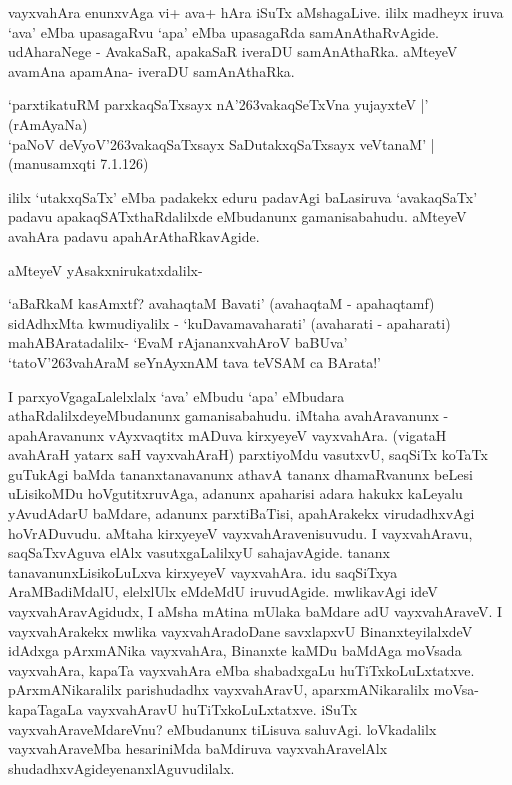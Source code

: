 vayxvahAra enunxvAga vi+ ava+ hAra iSuTx aMshagaLive. ililx madheyx iruva `ava' eMba upasagaRvu `apa' eMba upasagaRda samAnAthaRvAgide. udAharaNege - AvakaSaR, apakaSaR iveraDU samAnAthaRka. aMteyeV avamAna apamAna- iveraDU samAnAthaRka.

\begin{shloka}
`parxtikatuRM parxkaqSaTxsayx nA\char'263vakaqSeTxVna yujayxteV |' (rAmAyaNa)\\\label{223}
`paNoV deVyoV\char'263vakaqSaTxsayx SaDutakxqSaTxsayx veVtanaM' | (manusamxqti 7.1.126)\label{223}
\end{shloka}

ililx `utakxqSaTx' eMba padakekx eduru padavAgi baLasiruva `avakaqSaTx' padavu apakaqSATxthaRdalilxde eMbudanunx gamanisabahudu. aMteyeV avahAra padavu apahArAthaRkavAgide.

aMteyeV yAsakxnirukatxdalilx-

\begin{shloka}
`aBaRkaM kasAmxtf? avahaqtaM Bavati' (avahaqtaM - apahaqtamf)\\\label{224}
sidAdhxMta kwmudiyalilx - `kuDavamavaharati' (avaharati - apaharati)\\
mahABAratadalilx- `EvaM rAjananxvahAroV baBUva'\\\label{224}
`tatoV\char'263vahAraM seYnAyxnAM tava teVSAM ca BArata!'
\end{shloka}

I parxyoVgagaLalelxlalx `ava' eMbudu `apa' eMbudara athaRdalilxdeyeMbudanunx gamanisabahudu. iMtaha avahAravanunx - apahAravanunx vAyxvaqtitx mADuva kirxyeyeV vayxvahAra. (vigataH avahAraH yatarx saH vayxvahAraH) parxtiyoMdu vasutxvU, saqSiTx koTaTx guTukAgi baMda tananxtanavanunx athavA tananx dhamaRvanunx beLesi uLisikoMDu hoVgutitxruvAga, adanunx apaharisi adara hakukx kaLeyalu yAvudAdarU baMdare, adanunx parxtiBaTisi, apahArakekx virudadhxvAgi hoVrADuvudu. aMtaha kirxyeyeV vayxvahAravenisuvudu. I vayxvahAravu, saqSaTxvAguva elAlx vasutxgaLalilxyU sahajavAgide. tananx tanavanunxLisikoLuLxva kirxyeyeV vayxvahAra. idu saqSiTxya AraMBadiMdalU, elelxlUlx eMdeMdU iruvudAgide. mwlikavAgi ideV vayxvahAravAgidudx, I aMsha mAtina mUlaka baMdare adU vayxvahAraveV. I vayxvahArakekx mwlika vayxvahAradoDane savxlapxvU BinanxteyilalxdeV idAdxga pArxmANika vayxvahAra, Binanxte kaMDu baMdAga moVsada vayxvahAra, kapaTa vayxvahAra eMba shabadxgaLu huTiTxkoLuLxtatxve. pArxmANikaralilx parishudadhx vayxvahAravU, aparxmANikaralilx moVsa-kapaTagaLa vayxvahAravU huTiTxkoLuLxtatxve. iSuTx vayxvahAraveMdareVnu? eMbudanunx tiLisuva saluvAgi. loVkadalilx vayxvahAraveMba hesariniMda baMdiruva vayxvahAravelAlx shudadhxvAgideyenanxlAguvudilalx.

